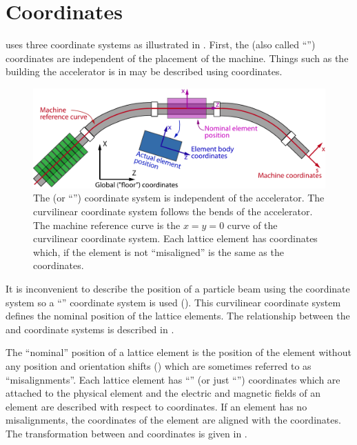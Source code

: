 \chapter{Coordinates}
\label{s:coords}

\vspace*{-0.3in}
\accellat uses three coordinate systems as illustrated in . First, the  (also
called ``'') coordinates are independent of the placement of the machine. Things such as the
building the accelerator is in may be described using  coordinates.

\begin{figure}[!b]
  \centering
  \includegraphics[width=5.0in]{coordinates.pdf}
  \caption[The three coordinate system used by \accellat.]
{The  (or ``'') coordinate system
is independent of the accelerator.  The  curvilinear coordinate system follows the bends
of the accelerator. The machine reference curve is the $x = y = 0$ curve of the curvilinear coordinate
system. Each lattice element has  coordinates which, if the element is
not ``misaligned'' is the same as the  coordinates.}
  \label{f:coords}
\end{figure}

It is inconvenient to describe the position of a particle beam using the 
 coordinate system so
a ``'' coordinate system is used ().  This curvilinear coordinate
system defines the nominal position of the lattice elements. The relationship between the
 and  coordinate systems is described in .

The ``nominal'' position of a lattice element is the position of the element without any
position and orientation shifts () 
which are sometimes referred to as ``misalignments''. 
Each lattice element has ``'' (or just ``'') 
coordinates which are attached to the physical element and the electric and magnetic
fields of an element are described with respect to  coordinates.  If an element
has no
misalignments, the  coordinates of the element are aligned with the 
 coordinates.
The transformation between  and  coordinates is given in
.

